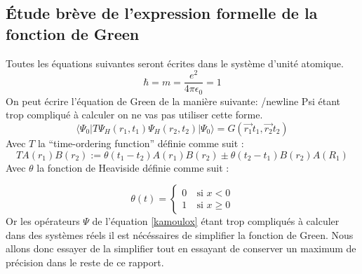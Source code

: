 \documentclass[12pt]{article}
\begin{document}
\subsection{\'Etude br\`eve de l'expression formelle de la fonction de Green}
Toutes les \'equations suivantes seront \'ecrites dans le syst\`eme d'unit\'e atomique.
\begin{equation}
 \hbar = m = \frac{e^2}{4 \pi \epsilon_0} = 1
\end{equation}
On peut \'ecrire l'\'equation de Green de la mani\`ere suivante:
/newline
Psi étant trop compliqué à calculer on ne vas pas utiliser cette forme.
\begin{equation}
\label{kamoulox}
 \langle \Psi_0 | T \Psi_H (r_1, t_1) \Psi_H (r_2, t_2) | \Psi_0 \rangle = G(\vec{r_1} t_1, \vec{r_2}  t_2)
\end{equation}
Avec $T$ la ``time-ordering function'' d\'efinie comme suit :
\begin{equation}
 T{A(r_1)B(r_2)} := \theta(t_1 - t_2)A(r_1)B(r_2) \pm \theta(t_2 - t_1)B(r_2) A(R_1)
\end{equation}
Avec $\theta$ la fonction de Heaviside d\'efinie comme suit :

\begin{equation}
\theta(t) = 
\left\{ \begin{array}{rl}
 0 &\ \text{si }x <0\\
 1 &\ \text{si }x \geq 0

\end{array} \right.
\end{equation}
Or les op\'erateurs $\Psi$ de l'\'equation \ref{kamoulox} \'etant trop compliqu\'es \`a calculer dans des syst\`emes r\'eels il est n\'ec\'essaires de simplifier la fonction de Green.
Nous allons donc essayer de la simplifier tout en essayant de conserver un maximum de pr\'ecision dans le reste de ce rapport.
\end{document}
